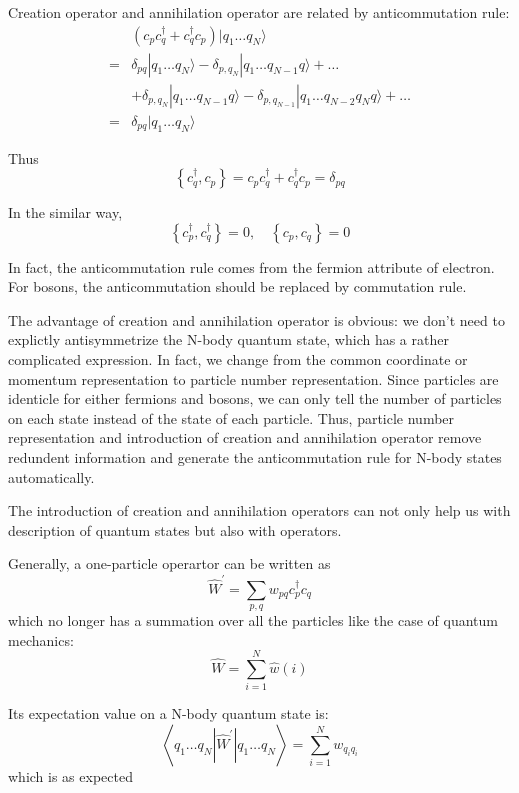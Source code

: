 \documentclass[bachelor, english]{ustcthesis}
\begin{document}
Creation operator and annihilation operator are related by anticommutation rule:
$$
\begin{aligned}
	&\left(c_{p} c_{q}^{\dagger}+c_{q}^{\dagger} c_{p}\right) | q_{1} \ldots q_{N} \rangle
	\\
	=&\delta_{p q} | q_{1} \ldots q_{N} \rangle-\delta_{p, q_{N}} | q_{1} \ldots q_{N-1} q \rangle+\ldots
	\\
	&+ \delta_{p, q_{N}} | q_{1} \ldots q_{N-1} q \rangle-\delta_{p, q_{N-1}} | q_{1} \ldots q_{N-2} q_{N} q \rangle+\ldots
	\\
	=&\delta_{p q} | q_{1} \ldots q_{N} \rangle
\end{aligned}
$$

Thus 
$$
\left\{c_{q}^{\dagger}, c_{p}\right\}=c_{p} c_{q}^{\dagger}+c_{q}^{\dagger} c_{p}=\delta_{p q}
$$

In the similar way,
$$
\left\{c_{p}^{\dagger}, c_{q}^{\dagger}\right\}=0, \quad\left\{c_{p}, c_{q}\right\}=0
$$

In fact, the anticommutation rule comes from the fermion attribute of electron.
For bosons, the anticommutation should be replaced by commutation rule.

The advantage of creation and annihilation operator is obvious: we don't need to explictly antisymmetrize the N-body quantum state, which has a rather complicated expression.
In fact, we change from the common coordinate or momentum representation to particle number representation.
Since particles are identicle for either fermions and bosons, we can only tell the number of particles on each state instead of the state of each particle.
Thus, particle number representation and introduction of creation and annihilation operator remove redundent information and generate the anticommutation rule for N-body states automatically.

The introduction of creation and annihilation operators can not only help us with description of quantum states but also with operators.

Generally, a one-particle operartor can be written as
$$
\hat{W}^{\prime}=\sum_{p, q} w_{p q} c_{p}^{\dagger} c_{q}
$$
which no longer has a summation over all the particles like the case of quantum mechanics:
$$
\hat{W}=\sum_{i=1}^{N} \hat{w}(i)
$$

Its expectation value on a N-body quantum state is:
$$
\left\langle q_{1} \ldots q_{N}\left|\hat{W}^{\prime}\right| q_{1} \ldots q_{N}\right\rangle=\sum_{i=1}^{N} w_{q_{i} q_{i}}
$$
which is as expected
\end{document}
